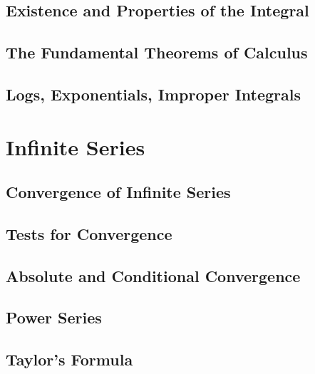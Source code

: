 \documentclass[12pt]{book}
\begin{document}
\section{Existence and Properties of the Integral}


\section{The Fundamental Theorems of Calculus}

\section{Logs, Exponentials, Improper Integrals}


\chapter{Infinite Series}

\section{Convergence of Infinite Series}


\section{Tests for Convergence}


\section{Absolute and Conditional Convergence}


\section{Power Series}


\section{Taylor's Formula}
\end{document}
